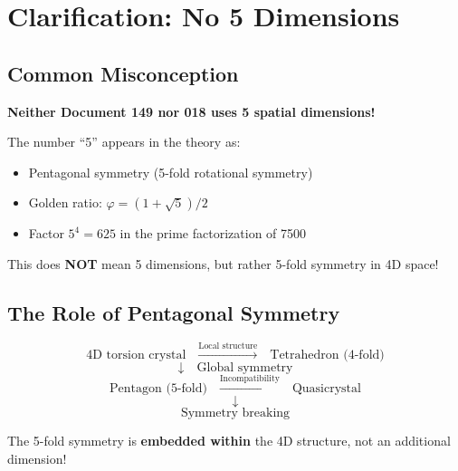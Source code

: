 	\section{Clarification: No 5 Dimensions}
	
	\subsection{Common Misconception}
	
	\begin{warning}
		\textbf{Neither Document 149 nor 018 uses 5 spatial dimensions!}
		
		The number \enquote{5} appears in the theory as:
		\begin{itemize}
			\item Pentagonal symmetry (5-fold rotational symmetry)
			\item Golden ratio: $\varphi = (1+\sqrt{5})/2$
			\item Factor $5^4 = 625$ in the prime factorization of 7500
		\end{itemize}
		
		This does \textbf{NOT} mean 5 dimensions, but rather 5-fold symmetry in 4D space!
	\end{warning}
	
	\subsection{The Role of Pentagonal Symmetry}
	
	\begin{equation}
		\text{4D torsion crystal} \quad \xrightarrow{\text{Local structure}} \quad \text{Tetrahedron (4-fold)}
	\end{equation}
	\begin{equation}
		\downarrow \quad \text{Global symmetry}
	\end{equation}
	\begin{equation}
		\text{Pentagon (5-fold)} \quad \xrightarrow{\text{Incompatibility}} \quad \text{Quasicrystal}
	\end{equation}
	\begin{equation}
		\downarrow
	\end{equation}
	\begin{equation}
		\text{Symmetry breaking}
	\end{equation}
	
	The 5-fold symmetry is \textbf{embedded within} the 4D structure, not an additional dimension!
	
